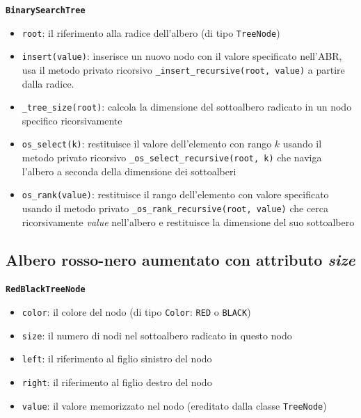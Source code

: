 \documentclass[onecolumn]{article}
\begin{document}
{\setlength{\parindent}{0em} \texttt{\textbf{BinarySearchTree}}}
\begin{itemize}
	\setlength\itemsep{0em}
	\item \verb|root|: il riferimento alla radice dell'albero (di tipo \texttt{TreeNode})
	\item \verb|insert(value)|: inserisce un nuovo nodo con il valore specificato nell'ABR, usa il metodo privato ricorsivo \newline \verb|_insert_recursive(root, value)| a partire dalla radice.
	\item \verb|_tree_size(root)|: calcola la dimensione del sottoalbero radicato in un nodo specifico ricorsivamente
	\item \verb|os_select(k)|: restituisce il valore dell'elemento con rango $k$ usando il metodo privato ricorsivo \verb|_os_select_recursive(root, k)| che naviga l'albero a seconda della dimensione dei sottoalberi 
	\item \verb|os_rank(value)|: restituisce il rango dell'elemento con valore specificato  usando il metodo privato \verb|_os_rank_recursive(root, value)| che cerca ricorsivamente \textit{value} nell'albero e restituisce la dimensione del suo sottoalbero
\end{itemize}

\subsection{Albero rosso-nero aumentato con attributo \textit{size}}
\texttt{\textbf{RedBlackTreeNode}}
\begin{itemize}
	\setlength\itemsep{0em}
	\item \verb|color|: il colore del nodo (di tipo \texttt{Color}: \texttt{RED} o \texttt{BLACK})
	\item \verb|size|: il numero di nodi nel sottoalbero radicato in questo nodo
	\item \verb|left|: il riferimento al figlio sinistro del nodo
	\item \verb|right|: il riferimento al figlio destro del nodo
	\item \verb|value|: il valore memorizzato nel nodo (ereditato dalla classe \texttt{TreeNode})
\end{itemize}
\end{document}
